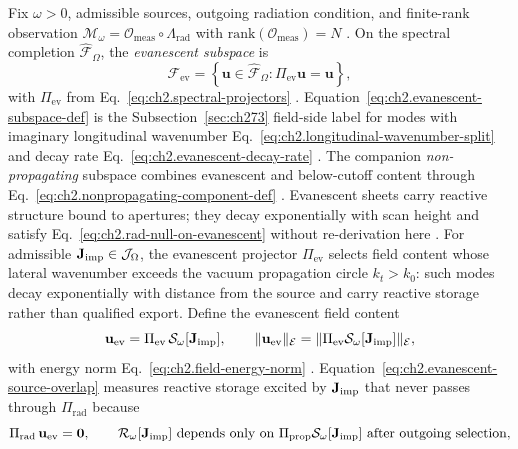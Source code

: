 Fix $\omega>0$, admissible sources, outgoing radiation condition, and finite-rank observation
$\mathcal{M}_\omega=\mathcal{O}_{\mathrm{meas}}\circ\Lambda_{\mathrm{rad}}$ with
$\mathrm{rank}(\mathcal{O}_{\mathrm{meas}})=N$ \cite{stratton1941}. On the spectral completion
$\widehat{\mathcal{F}}_\Omega$, the \emph{evanescent subspace} is
\begin{equation}
\label{eq:ch2.evanescent-subspace-def}
\mathcal{F}_{\mathrm{ev}}
=
\left\{
\mathbf{u}\in\widehat{\mathcal{F}}_\Omega:
\Pi_{\mathrm{ev}}\mathbf{u}=\mathbf{u}
\right\},
\end{equation}
with \(\Pi_{\mathrm{ev}}\) from Eq.~\eqref{eq:ch2.spectral-projectors}
\cite{stratton1941}. Equation~\eqref{eq:ch2.evanescent-subspace-def} is the
Subsection~\ref{sec:ch273} field-side label for modes with imaginary longitudinal
wavenumber Eq.~\eqref{eq:ch2.longitudinal-wavenumber-split} and decay rate
Eq.~\eqref{eq:ch2.evanescent-decay-rate} \cite{stratton1941}. The companion \emph{non-propagating} subspace combines evanescent and
below-cutoff content through Eq.~\eqref{eq:ch2.nonpropagating-component-def}
\cite{harrington2001}. Evanescent sheets carry reactive structure bound to apertures; they decay
exponentially with scan height and satisfy Eq.~\eqref{eq:ch2.rad-null-on-evanescent} without
re-derivation here \cite{stratton1941}.
For admissible \(\mathbf{J}_{\mathrm{imp}}\in\mathcal{J}_\Omega\), the evanescent projector \(\Pi_{\mathrm{ev}}\)
selects field content whose lateral wavenumber exceeds the vacuum propagation circle
\(k_t>k_0\): such modes decay exponentially with distance from the source and carry reactive
storage rather than qualified export. Define the evanescent field content
\begin{equation}
\label{eq:ch2.evanescent-source-overlap}
\mathbf{u}_{\mathrm{ev}}
=
\Pi_{\mathrm{ev}}\,\mathcal{S}_\omega[\mathbf{J}_{\mathrm{imp}}],
\qquad
\|\mathbf{u}_{\mathrm{ev}}\|_{\mathcal{E}}
=
\|\Pi_{\mathrm{ev}}\mathcal{S}_\omega[\mathbf{J}_{\mathrm{imp}}]\|_{\mathcal{E}},
\end{equation}
with energy norm Eq.~\eqref{eq:ch2.field-energy-norm} \cite{stratton1941}.
Equation~\eqref{eq:ch2.evanescent-source-overlap} measures reactive storage excited by
\(\mathbf{J}_{\mathrm{imp}}\) that never passes through \(\Pi_{\mathrm{rad}}\) because
\begin{equation}
\label{eq:ch2.evanescent-nonexport-law}
\Pi_{\mathrm{rad}}\,\mathbf{u}_{\mathrm{ev}}=\mathbf{0},
\qquad
\mathcal{R}_\omega[\Jimp]\ \text{depends only on}\ \Pi_{\mathrm{prop}}\mathcal{S}_\omega[\Jimp]
\ \text{after outgoing selection},
\end{equation}
